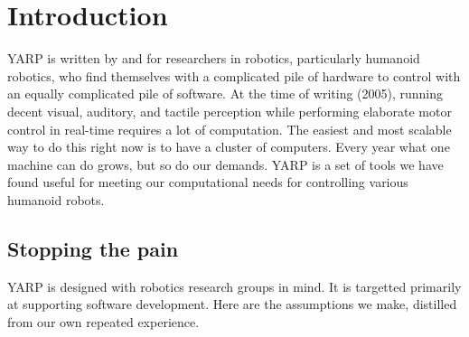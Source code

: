 \section{Introduction}

YARP is written by and for researchers in robotics, particularly
humanoid robotics, who find themselves with a complicated pile of
hardware to control with an equally complicated pile of software. At
the time of writing (2005), running decent visual, auditory, and
tactile perception while performing elaborate motor control in
real-time requires a lot of computation. The easiest and most scalable
way to do this right now is to have a cluster of computers. Every year
what one machine can do grows, but so do our demands. YARP is a set of
tools we have found useful for meeting our computational needs for
controlling various humanoid robots.

\subsection*{Stopping the pain}

YARP is designed with robotics research groups in mind.  
%
%
It is targetted primarily at supporting software development.
%
%
Here are the assumptions we make, distilled from our own repeated
experience.  
%

